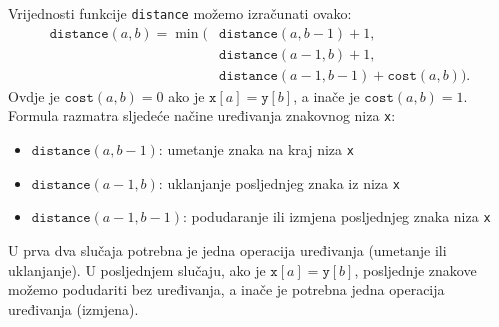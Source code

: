 Vrijednosti funkcije \texttt{distance} možemo izračunati
ovako:
\begin{equation*}
\begin{split}
\texttt{distance}(a,b) = \min(& \texttt{distance}(a,b-1)+1, \\
                           & \texttt{distance}(a-1,b)+1, \\
                           & \texttt{distance}(a-1,b-1)+\texttt{cost}(a,b)).
\end{split}
\end{equation*}
Ovdje je $\texttt{cost}(a,b)=0$ ako je $\texttt{x}[a]=\texttt{y}[b]$,
a inače je $\texttt{cost}(a,b)=1$.
Formula razmatra sljedeće načine
uređivanja znakovnog niza \texttt{x}:
\begin{itemize}
\item $\texttt{distance}(a,b-1)$: umetanje znaka na kraj niza \texttt{x}
\item $\texttt{distance}(a-1,b)$: uklanjanje posljednjeg znaka iz niza \texttt{x}
\item $\texttt{distance}(a-1,b-1)$: podudaranje ili izmjena posljednjeg znaka niza \texttt{x}
\end{itemize}
U prva dva slučaja potrebna je jedna operacija uređivanja
(umetanje ili uklanjanje).
U posljednjem slučaju, ako je $\texttt{x}[a]=\texttt{y}[b]$,
posljednje znakove možemo podudariti bez uređivanja,
a inače je potrebna jedna operacija uređivanja (izmjena).

